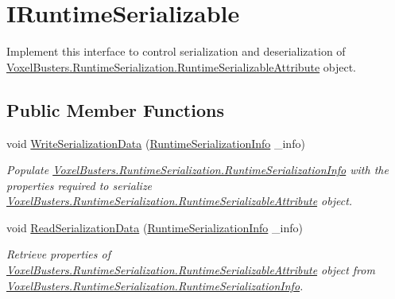 \hypertarget{interface_voxel_busters_1_1_runtime_serialization_1_1_i_runtime_serializable}{}\section{I\+Runtime\+Serializable}
\label{interface_voxel_busters_1_1_runtime_serialization_1_1_i_runtime_serializable}


Implement this interface to control serialization and deserialization of \hyperlink{class_voxel_busters_1_1_runtime_serialization_1_1_runtime_serializable_attribute}{Voxel\+Busters.\+Runtime\+Serialization.\+Runtime\+Serializable\+Attribute} object.  


\subsection*{Public Member Functions}
\begin{DoxyCompactItemize}
\item 
void \hyperlink{interface_voxel_busters_1_1_runtime_serialization_1_1_i_runtime_serializable_ad0d562a5e94e40838224b0a126f87c43}{Write\+Serialization\+Data} (\hyperlink{class_voxel_busters_1_1_runtime_serialization_1_1_runtime_serialization_info}{Runtime\+Serialization\+Info} \+\_\+info)
\begin{DoxyCompactList}\small\item\em Populate \hyperlink{class_voxel_busters_1_1_runtime_serialization_1_1_runtime_serialization_info}{Voxel\+Busters.\+Runtime\+Serialization.\+Runtime\+Serialization\+Info} with the properties required to serialize \hyperlink{class_voxel_busters_1_1_runtime_serialization_1_1_runtime_serializable_attribute}{Voxel\+Busters.\+Runtime\+Serialization.\+Runtime\+Serializable\+Attribute} object. \end{DoxyCompactList}\item 
void \hyperlink{interface_voxel_busters_1_1_runtime_serialization_1_1_i_runtime_serializable_a052bee3d106563961eb5f7d0d7a26756}{Read\+Serialization\+Data} (\hyperlink{class_voxel_busters_1_1_runtime_serialization_1_1_runtime_serialization_info}{Runtime\+Serialization\+Info} \+\_\+info)
\begin{DoxyCompactList}\small\item\em Retrieve properties of \hyperlink{class_voxel_busters_1_1_runtime_serialization_1_1_runtime_serializable_attribute}{Voxel\+Busters.\+Runtime\+Serialization.\+Runtime\+Serializable\+Attribute} object from \hyperlink{class_voxel_busters_1_1_runtime_serialization_1_1_runtime_serialization_info}{Voxel\+Busters.\+Runtime\+Serialization.\+Runtime\+Serialization\+Info}. \end{DoxyCompactList}\end{DoxyCompactItemize}


